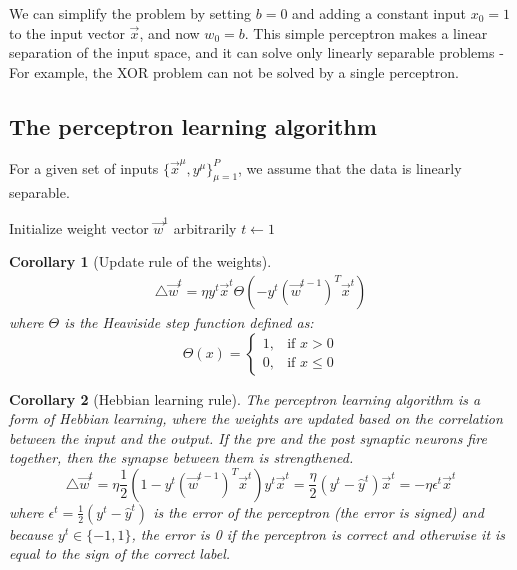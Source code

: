 \documentclass[11pt]{book} %
\newtheorem{corollary}{Corollary}[section]
\begin{document}
We can simplify the problem by setting $b = 0$ and adding a constant input $x_0 = 1$ to the input vector $\vec{x}$, and now $w_0 = b$.
This simple perceptron makes a linear separation of the input space, and it can solve only linearly separable problems - 
For example, the XOR problem can not be solved by a single perceptron.


\subsection{The perceptron learning algorithm}
For a given set of inputs $\{\vec{x}^\mu, y^\mu\}_{\mu=1}^{P}$, we assume that the data is linearly separable.

\begin{algorithm}[H]
    \SetAlgoLined
    \caption{The Perceptron Learning Algorithm}
    
    
    Initialize weight vector $\vec{w}^1$ arbitrarily\;
    $t \leftarrow 1$\;
    
\end{algorithm}


\begin{corollary}[Update rule of the weights]
    \begin{align}
        \bigtriangleup \vec{w}^t = \eta y^t \vec{x}^t \Theta (-y^t (\vec{w}^{t-1})^T \vec{x}^t)
    \end{align}
where $\Theta$ is the Heaviside step function defined as:
\[
    \Theta(x) = \begin{cases} 1, & \text{if } x > 0 \\ 0, & \text{if } x \leq 0 \end{cases}
\]
\end{corollary}

\begin{corollary}[Hebbian learning rule]
The perceptron learning algorithm is a form of Hebbian learning, where the weights are updated based on the correlation between the input and the output.
If the pre and the post synaptic neurons fire together, then the synapse between them is strengthened.
\[
    \bigtriangleup \vec{w}^t = \eta \frac{1}{2} (1 - y^t (\vec{w}^{t-1})^T \vec{x}^t) y^t \vec{x}^t = \frac{\eta}{2} (y^t -\hat{y}^t) \vec{x}^t = - \eta \epsilon^t \vec{x}^t
\]
where $\epsilon^t = \frac{1}{2} (y^t -\hat{y}^t)$ is the error of the perceptron (the error is signed) and because $y^t \in \{-1, 1\}$, the error is 0 if the perceptron is correct 
and otherwise it is equal to the sign of the correct label.
\end{corollary}
\end{document}

